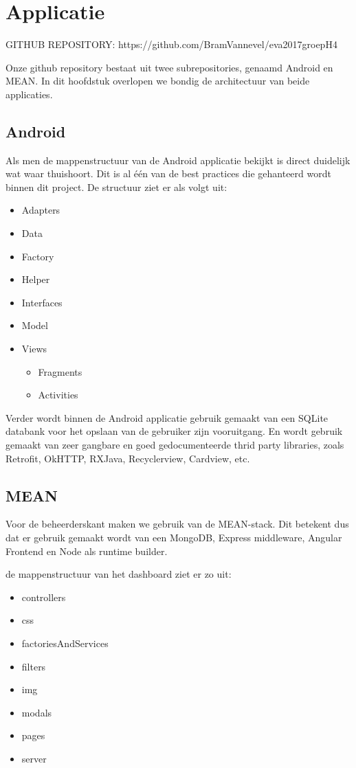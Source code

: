 \chapter{Applicatie}
\label{ch:app}

GITHUB REPOSITORY: https://github.com/BramVannevel/eva2017groepH4

Onze github repository bestaat uit twee subrepositories, genaamd Android en MEAN. In dit hoofdstuk overlopen we bondig de architectuur van beide applicaties. 

\section{Android}
Als men de mappenstructuur van de Android applicatie bekijkt is direct duidelijk wat waar thuishoort. Dit is al één van de best practices die gehanteerd wordt binnen dit project. De structuur ziet er als volgt uit:

\begin{itemize}
	\item Adapters
	\item Data
	\item Factory
	\item Helper
	\item Interfaces
	\item Model
	\item Views
	\begin{itemize}
		\item Fragments
		\item Activities
	\end{itemize}
\end{itemize} 

Verder wordt binnen de Android applicatie gebruik gemaakt van een SQLite databank voor het opslaan van de gebruiker zijn vooruitgang. En wordt gebruik gemaakt van zeer gangbare en goed gedocumenteerde thrid party libraries, zoals Retrofit, OkHTTP, RXJava, Recyclerview, Cardview, etc.

\section{MEAN}
Voor de beheerderskant maken we gebruik van de MEAN-stack. Dit betekent dus dat er gebruik gemaakt wordt van een MongoDB, Express middleware, Angular Frontend en Node als runtime builder.

de mappenstructuur van het dashboard ziet er zo uit:

\begin{itemize}
	\item controllers
\item 	css	
	\item factoriesAndServices	
	\item filters	
\item	img	
\item	modals	
\item	pages	
\item	server
\end{itemize}